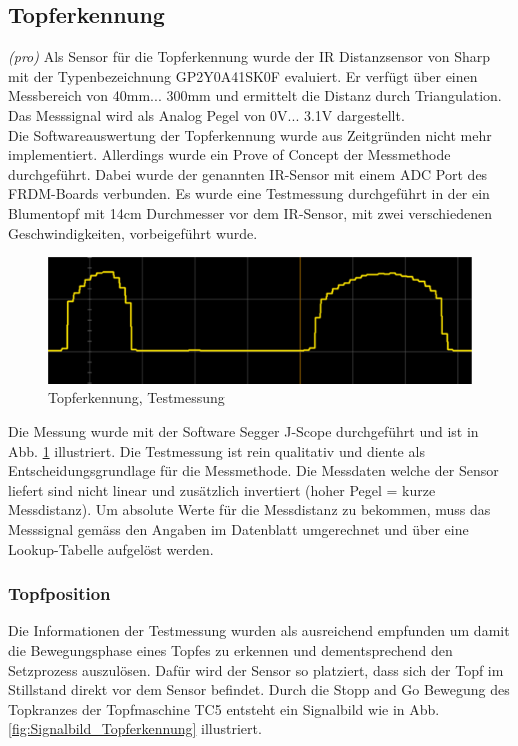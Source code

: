 \subsection{Topferkennung} \label{sec:Topferkennung}

\textit{(pro)} Als Sensor für die Topferkennung wurde der IR Distanzsensor von Sharp mit der Typenbezeichnung GP2Y0A41SK0F evaluiert. Er verfügt über einen Messbereich von 40mm... 300mm und ermittelt die Distanz durch Triangulation. Das Messsignal wird als Analog Pegel von 0V... 3.1V dargestellt.\\
Die Softwareauswertung der Topferkennung wurde aus Zeitgründen nicht mehr implementiert. Allerdings wurde ein Prove of Concept der Messmethode durchgeführt. Dabei wurde der genannten IR-Sensor mit einem ADC Port des FRDM-Boards verbunden. Es wurde eine Testmessung durchgeführt in der ein Blumentopf mit 14cm Durchmesser vor dem IR-Sensor, mit zwei verschiedenen Geschwindigkeiten, vorbeigeführt wurde. 

\begin{figure}[H]
	\includegraphics[width=1\textwidth]{Illustrationen/6-Umsetzung/IR_Sensor_Messung.png}
	\caption{Topferkennung, Testmessung}
	\label{fig:IR_Sensor_POC}
\end{figure}

Die Messung wurde mit der Software Segger J-Scope durchgeführt und ist in Abb. \ref{fig:IR_Sensor_POC} illustriert. Die Testmessung ist rein qualitativ und diente als Entscheidungsgrundlage für die Messmethode. Die Messdaten welche der Sensor liefert sind nicht linear und zusätzlich invertiert (hoher Pegel = kurze Messdistanz). Um absolute Werte für die Messdistanz zu bekommen, muss das Messsignal gemäss den Angaben im Datenblatt umgerechnet und über eine Lookup-Tabelle aufgelöst werden.

\subsubsection{Topfposition}
Die Informationen der Testmessung wurden als ausreichend empfunden um damit die Bewegungsphase eines Topfes zu erkennen und dementsprechend den Setzprozess auszulösen. Dafür wird der Sensor so platziert, dass sich der Topf im Stillstand direkt vor dem Sensor befindet. Durch die Stopp and Go Bewegung des Topkranzes der Topfmaschine TC5 entsteht ein Signalbild wie in Abb. \ref{fig:Signalbild_Topferkennung} illustriert.\\

